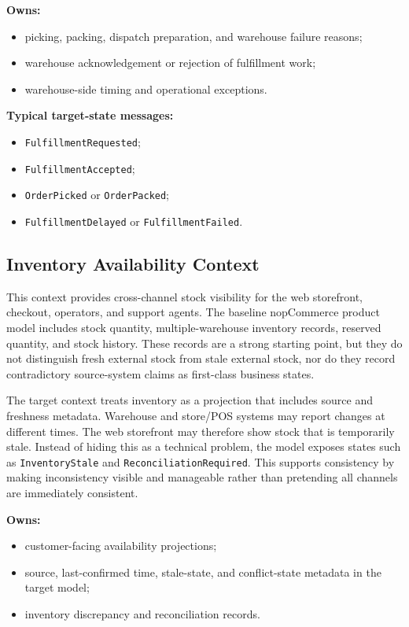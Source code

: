 \textbf{Owns:}
\begin{itemize}
    \item picking, packing, dispatch preparation, and warehouse failure reasons;
    \item warehouse acknowledgement or rejection of fulfillment work;
    \item warehouse-side timing and operational exceptions.
\end{itemize}

\textbf{Typical target-state messages:}
\begin{itemize}
    \item \texttt{FulfillmentRequested};
    \item \texttt{FulfillmentAccepted};
    \item \texttt{OrderPicked} or \texttt{OrderPacked};
    \item \texttt{FulfillmentDelayed} or \texttt{FulfillmentFailed}.
\end{itemize}

\subsection{Inventory Availability Context}

This context provides cross-channel stock visibility for the web storefront, checkout,
operators, and support agents. The baseline nopCommerce product model includes stock quantity,
multiple-warehouse inventory records, reserved quantity, and stock history. These records are a
strong starting point, but they do not distinguish fresh external stock from stale external
stock, nor do they record contradictory source-system claims as first-class business states.

The target context treats inventory as a projection that includes source and freshness metadata.
Warehouse and store/POS systems may report changes at different times. The web storefront may
therefore show stock that is temporarily stale. Instead of hiding this as a technical problem,
the model exposes states such as \texttt{InventoryStale} and
\texttt{ReconciliationRequired}. This supports consistency by making inconsistency visible and
manageable rather than pretending all channels are immediately consistent.

\textbf{Owns:}
\begin{itemize}
    \item customer-facing availability projections;
    \item source, last-confirmed time, stale-state, and conflict-state metadata in the target model;
    \item inventory discrepancy and reconciliation records.
\end{itemize}

